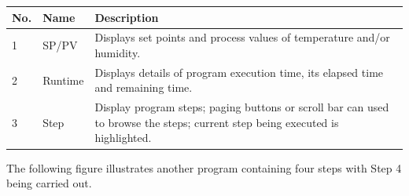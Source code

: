 \begin{longtable}[]{@{}|l|l|l|@{}}
\toprule
\rowcolor{brown}\begin{minipage}[b]{0.04\columnwidth}\raggedright
{\bf{No.}}\strut
\end{minipage} & \begin{minipage}[b]{0.23\columnwidth}\raggedright
{\bf{Name}}\strut
\end{minipage} & \begin{minipage}[b]{0.65\columnwidth}\raggedright
{\bf{Description}}\strut
\end{minipage}\tabularnewline
\midrule
\endhead
\begin{minipage}[t]{0.04\columnwidth}\raggedright
1\strut
\end{minipage} & \begin{minipage}[t]{0.23\columnwidth}\raggedright
SP/PV\strut
\end{minipage} & \begin{minipage}[t]{0.65\columnwidth}\raggedright
Displays set points and process values of temperature and/or
humidity.\strut
\end{minipage}\tabularnewline
\begin{minipage}[t]{0.04\columnwidth}\raggedright
2\strut
\end{minipage} & \begin{minipage}[t]{0.23\columnwidth}\raggedright
Runtime\strut
\end{minipage} & \begin{minipage}[t]{0.65\columnwidth}\raggedright
Displays details of program execution time, its elapsed time and
remaining time.\strut
\end{minipage}\tabularnewline
\begin{minipage}[t]{0.04\columnwidth}\raggedright
3\strut
\end{minipage} & \begin{minipage}[t]{0.23\columnwidth}\raggedright
Step\strut
\end{minipage} & \begin{minipage}[t]{0.65\columnwidth}\raggedright
Display program steps; paging buttons or scroll bar can used to browse
the steps; current step being executed is highlighted.\strut
\end{minipage}\tabularnewline
\bottomrule
\end{longtable}

The following figure illustrates another program containing four steps
with Step 4 being carried out.


